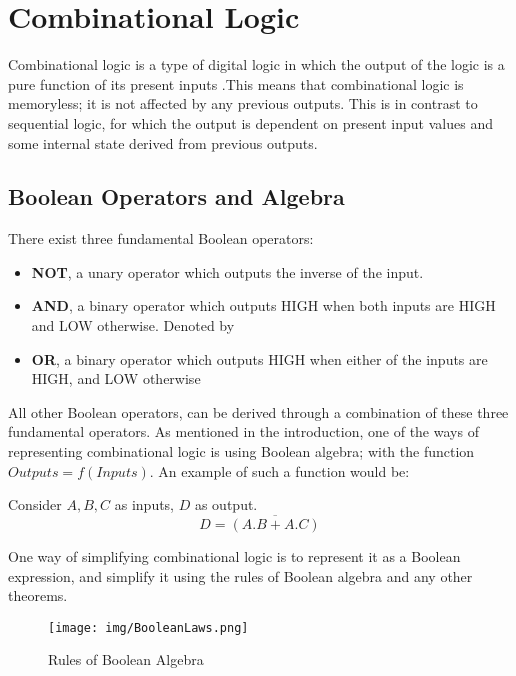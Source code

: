 \section{Combinational Logic}
Combinational logic is a type of digital logic in which the output of the logic is a pure function of its present inputs \cite{comblog_wiki}.This means that combinational logic is memoryless; it is not affected by any previous outputs. This is in contrast to sequential logic, for which the output is dependent on present input values and some internal state derived from previous outputs.

\subsection{Boolean Operators and Algebra}
There exist three fundamental Boolean operators:
\begin{itemize}
    \item \textbf{NOT}, a unary operator which outputs the inverse of the input.
    \item \textbf{AND}, a binary operator which outputs HIGH when both inputs are HIGH and LOW otherwise. Denoted by 
    \item \textbf{OR}, a binary operator which outputs HIGH when either of the inputs are HIGH, and LOW otherwise
\end{itemize}

All other Boolean operators, can be derived through a combination of these three fundamental operators. As mentioned in the introduction, one of the ways of representing combinational logic is using Boolean algebra; with the function $Outputs = f(Inputs)$. An example of such a function would be: \\
\begin{center}
Consider $A,B,C$ as inputs, $D$ as output. 
    \begin{equation}
        D = \overline{(A.B + A.C)}
    \end{equation}
\end{center}

One way of simplifying combinational logic is to represent it as a Boolean expression, and simplify it using the rules of Boolean algebra and any other theorems. 

\begin{figure} [h]
    \centering
    \texttt{[image: img/BooleanLaws.png]}
    \caption{Rules of Boolean Algebra \cite{boolalg_laws}}
    \label{fig:boolalg_laws}
\end{figure}

